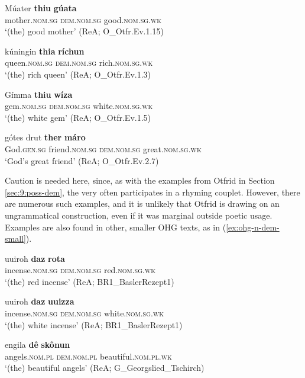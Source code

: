 \documentclass[output=paper,colorlinks,citecolor=brown]{langscibook}
\begin{document}
\begin{exe}
 \ex\label{ex:ohg-n-dem}
 \begin{xlist}
  \ex\gll Múater \textbf{thiu} \textbf{gúata}\\
  mother.\textsc{nom.sg} \textsc{dem.nom.sg} good.\textsc{nom.sg.wk}\\
  \glt `(the) good mother' (ReA; O\_Otfr.Ev.1.15)
  
  \ex\gll kúningin \textbf{thia} \textbf{ríchun}\\
  queen.\textsc{nom.sg} \textsc{dem.nom.sg} rich.\textsc{nom.sg.wk}\\
  \glt `(the) rich queen' (ReA; O\_Otfr.Ev.1.3)
  
  \ex\label{ex:ohg-n-demc}\gll Gímma \textbf{thiu} \textbf{wíza}\\
  gem.\textsc{nom.sg} \textsc{dem.nom.sg} white.\textsc{nom.sg.wk}\\
  \glt `(the) white gem' (ReA; O\_Otfr.Ev.1.5)
  
  \ex\gll gótes drut \textbf{ther} \textbf{máro}\\
  God.\textsc{gen.sg} friend.\textsc{nom.sg} \textsc{dem.nom.sg} great.\textsc{nom.sg.wk}\\
  \glt `God's great friend' (ReA; O\_Otfr.Ev.2.7)
 \end{xlist}
\end{exe}

Caution is needed here, since, as with the examples from Otfrid in Section \ref{sec:9:poss-dem}, the  very often participates in a rhyming couplet. However, there are numerous such examples, and it is unlikely that Otfrid is drawing on an ungrammatical construction, even if it was marginal outside poetic usage. Examples are also found in other, smaller OHG texts, as in (\ref{ex:ohg-n-dem-small}).

\begin{exe}
 \ex\label{ex:ohg-n-dem-small}
 \begin{xlist}
  \ex\gll uuiroh \textbf{daz} \textbf{rota}\\
  incense.\textsc{nom.sg} \textsc{dem.nom.sg} red.\textsc{nom.sg.wk}\\
  \glt `(the) red incense' (ReA; BR1\_BaslerRezept1)
  
  \ex\gll uuiroh \textbf{daz} \textbf{uuizza}\\
  incense.\textsc{nom.sg} \textsc{dem.nom.sg} white.\textsc{nom.sg.wk}\\
  \glt `(the) white incense' (ReA; BR1\_BaslerRezept1)
  
  \ex\gll engila \textbf{dê} \textbf{skônun}\\
  angels.\textsc{nom.pl} \textsc{dem.nom.pl} beautiful.\textsc{nom.pl.wk}\\
  \glt `(the) beautiful angels' (ReA; G\_Georgslied\_Tschirch)
 \end{xlist}
\end{exe}
\end{document}
